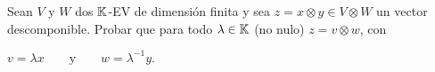 \item Sean $V$ y $W$ dos $\mathbb{K}$-EV de dimensión finita y sea $z=x\otimes y\in V\otimes W$ un vector descomponible. Probar que para todo $\lambda\in\mathbb{K}$ (no nulo) $z=v\otimes w$, con \begin{center}
        $v=\lambda x\qquad\text{y}\qquad w=\lambda^{-1}y.$
    \end{center}
    \begin{mdframed}[style=s]
        
    \end{mdframed}